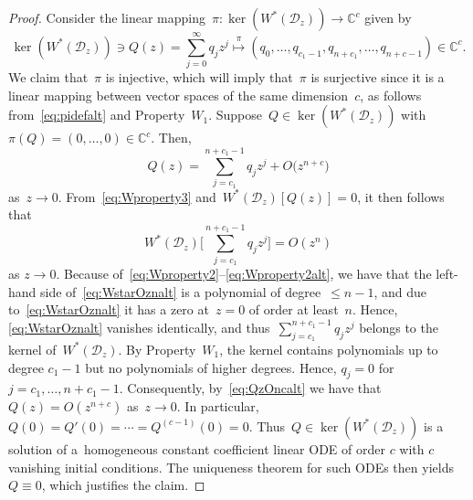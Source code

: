 \documentclass[10pt,a4paper]{article}
\numberwithin{equation}{section}
\newcommand*{\Cset}{\mathbb{C}} %
\begin{document}
\begin{proof}
 Consider the linear mapping~$\pi\colon \ker(W^*(\mathscr{D}_z)) \to \Cset^c$ given by
 \begin{equation}
 \label{eq:pidefalt}
 \ker(W^*(\mathscr{D}_z)) \ni Q(z) = \sum_{j=0}^{\infty} q_j z^j \stackrel{\pi}{\longmapsto} (q_0, \dots, q_{c_1-1}, q_{n+c_1}, \dots, q_{n+c-1}) \in \Cset^c.
 \end{equation}
 We claim that~$\pi$ is injective, which will imply that~$\pi$ is surjective since it is a linear mapping between vector spaces of the same dimension~$c$, as follows from~\eqref{eq:pidefalt} and Property~$W_1$. Suppose~$Q \in \ker(W^*(\mathscr{D}_z))$ with~$\pi(Q) = (0, \dots, 0) \in \mathbb C^c$. Then,
 \begin{equation}
 \label{eq:QzOncalt}	
 Q(z) = \sum_{j=c_1}^{n+c_1-1} q_j z^j + O\big(z^{n+c}\big)
 \end{equation}
 as~$z \to 0$.
 From~\eqref{eq:Wproperty3} and~$W^*(\mathscr{D}_z)[Q(z)] = 0$, it then follows that
 \begin{equation}
 \label{eq:WstarOznalt}
 W^*(\mathscr{D}_z)\Bigg[ \sum_{j=c_1}^{n+c_1-1} q_j z^j\Bigg] = O(z^n)
 \end{equation}
 as $z \to 0$. Because of~\eqref{eq:Wproperty2}--\eqref{eq:Wproperty2alt}, we have
 that the left-hand side of~\eqref{eq:WstarOznalt} is a polynomial of degree~$\leq n-1$,
 and due to~\eqref{eq:WstarOznalt} it has a zero at~$z=0$ of order at least~$n$. Hence, \eqref{eq:WstarOznalt} vanishes identically, and thus~$\sum_{j=c_1}^{n+c_1-1} q_j z^j$
 belongs to the kernel of~$W^*(\mathscr{D}_z)$. By Property~$W_1$, the kernel contains polynomials up to degree $c_1-1$ but no polynomials of higher degrees. Hence, $q_j=0$ for $j=c_1, \dots, n+c_1-1$. Consequently, by~\eqref{eq:QzOncalt}
 we have that~$Q(z) = O(z^{n+c})$ as~$z \to 0$.
 In particular, $Q(0) = Q'(0) = \cdots = Q^{(c-1)}(0) = 0$.
 Thus~$Q \in \ker(W^*(\mathscr{D}_z))$ is a solution of a~homogeneous constant coefficient linear ODE of order $c$ with $c$ vanishing initial conditions.
The uniqueness theorem for such ODEs then yields~$Q \equiv 0$, which justifies the claim.


\end{proof}
\end{document}
